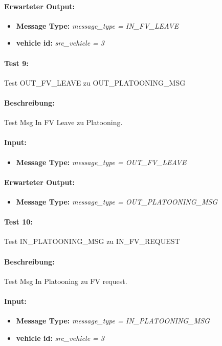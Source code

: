 \documentclass[a4paper, 12pt, titlepage]{scrartcl}
\begin{document}
{			\paragraph{Erwarteter Output:}
			\begin{itemize} \itemsep-0.5em
				\item \textbf{Message Type:} \emph{message\_type = IN\_FV\_LEAVE}
				\item \textbf{vehicle id:} \emph{src\_vehicle = 3}
			\end{itemize}

			\paragraph{Test 9:}{Test OUT\_FV\_LEAVE zu OUT\_PLATOONING\_MSG}
			\paragraph{Beschreibung:} Test Msg In FV Leave zu Platooning.
			\paragraph{Input:}
			\begin{itemize} \itemsep-0.5em
				\item \textbf{Message Type:} \emph{message\_type = OUT\_FV\_LEAVE}
			\end{itemize}
			\paragraph{Erwarteter Output:}
			\begin{itemize} \itemsep-0.5em
				\item \textbf{Message Type:} \emph{message\_type = OUT\_PLATOONING\_MSG}
			\end{itemize}

			\paragraph{Test 10:}{Test IN\_PLATOONING\_MSG zu IN\_FV\_REQUEST}
			\paragraph{Beschreibung:} Test Msg In Platooning zu FV request.
			\paragraph{Input:}
			\begin{itemize} \itemsep-0.5em
				\item \textbf{Message Type:} \emph{message\_type = IN\_PLATOONING\_MSG}
				\item \textbf{vehicle id:} \emph{src\_vehicle = 3}
			\end{itemize}
}
\end{document}
